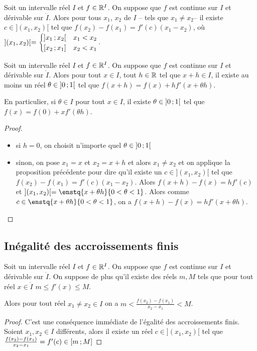 \begin{prop}
  Soit un intervalle réel $I$ et $f \in \mathbb{R}^I$. On suppose que $f$ est continue sur $I$ et dérivable sur $\mathring{I}$. Alors pour tous $x_1$, $x_2$ de $I$ -- tels que $x_1 \neq x_2$-- il existe $c \in ](x_1,x_2)[$ tel que $f(x_2)-f(x_1)=f'(c)(x_1-x_2)$, où $ ](x_1,x_2)[ = \begin{cases} \left] x_1 \, ;  x_2 \right[ & x_1 < x_2 \\ \left[ x_2 \, ;  x_1 \right] & x_2 < x_1 \end{cases}$.
\end{prop}
\begin{prop}
  Soit un intervalle réel $I$ et $f \in \mathbb{R}^I$. On suppose que $f$ est continue sur $I$ et dérivable sur $\mathring{I}$. Alors pour tout $x \in I$, tout $h \in \mathbb{R}$ tel que $x+h \in I$, il existe au moins un réel $\theta \in \left] 0 \, ;  1 \right[$ tel que $f(x+h)=f(x)+hf'(x+\theta h)$. 

En particulier, si $\theta \in I$ pour tout $x \in I$, il existe $\theta \in \left] 0 \, ;  1 \right[$ tel que $f(x)=f(0)+xf'(\theta h)$.
\end{prop}
\begin{proof}
  \begin{itemize}
  \item si $h=0$, on choisit n'importe quel $\theta \in \left] 0 \, ;  1 \right[$
  \item sinon, on pose $x_1=x$ et $x_2=x+h$ et alors $x_1 \neq x_2$ et on applique la proposition précédente pour dire qu'il existe un $c \in ](x_1,x_2)[$ tel que $f(x_2)-f(x_1)=f'(c)(x_1-x_2)$. Alors $f(x+h)-f(x)=hf'(c)$ et $](x_1,x_2)[ = \enstq{x+\theta h}{0 < \theta < 1}$. Alors comme $c \in \enstq{x+\theta h}{0 < \theta < 1}$, on a $f(x+h)-f(x)=hf'(x + \theta h)$.
  \end{itemize}
\end{proof}

\subsection{Inégalité des accroissements finis}

\begin{theo}[IAF]\label{theo:iaf}
  Soit un intervalle réel $I$ et $f \in \mathbb{R}^I$. On suppose que $f$ est continue sur $I$ et dérivable sur $\mathring{I}$. On suppose de plus qu'il existe des réels $m,M$ tels que pour tout réel $x \in \mathring{I}$ $m \leq f'(x) \leq M$.

Alors pour tout réel $x_1 \neq x_2 \in I$ on a $m < \frac{f(x_2)-f(x_1)}{x_2-x_1} < M$.
\end{theo}
\begin{proof}
  C'est une conséquence immédiate de l'égalité des accroissements finis. Soient $x_1, x_2 \in I$ différents, alors il existe un réel $c \in ](x_1,x_2)[$ tel que $\frac{f(x_2)-f(x_1)}{x_2-x_1} = f'(c) \in \left[ m \, ;  M \right]$
\end{proof}


